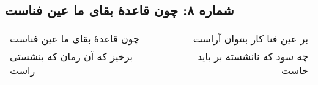 \begin{center}
\section*{شماره ۸: چون قاعدۀ بقای ما عین فناست}
\label{sec:008}
\begin{longtable}{l p{0.5cm} r}
چون قاعدهٔ بقای ما عین فناست
&&
بر عین فنا کار بنتوان آراست
\\
برخیز که آن زمان که بنشستی راست
&&
چه سود که نانشسته بر باید خاست
\\
\end{longtable}
\end{center}
